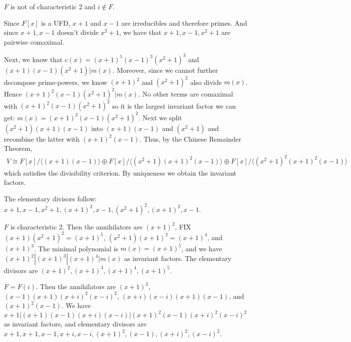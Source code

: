 \documentclass[12pt]{article}
\begin{document}
\begin{problem}[5]
\begin{case}[1]
$ F$ is not of characteristic 2 and  $ i \not\in F$.

	Since $ F[x]$ is a UFD,  $ x+1$ and  $ x-1$ are irreducibles and therefore primes. And since $x+1,x-1$ doesn't divide $ x^2+1$, we have that $ x+1, x-1,x^2+1$ are pairwise comaximal.

	Next, we know that $ c(x) = (x+1)^{5}(x-1)^3(x^2+1)^3$ and $(x+1)(x-1)(x^2+1) | m(x)$. Moreover, since we cannot further decompose prime-powers, we know $ (x+1)^2$ and $ (x^2+1)^2$ also divide $ m(x)$. Hence  $ (x+1)^2(x-1)(x^2+1)^2 | m(x)$. No other terms are comaximal with $ (x+1)^2(x-1)(x^2+1)^2$ so it is the largest invariant factor we can get: $ m(x) = (x+1)^2(x-1)(x^2+1)^2$. Next we split $ (x^2+1)(x+1)(x-1)$ into $ (x+1)(x-1)$ and $ (x^2+1)$ and recombine the latter with $ (x+1)^2(x-1)$. Thus, by the Chinese Remainder Theorem,
\begin{align*}
	V \cong F[x] / \langle (x+1)(x-1) \rangle \oplus F[x] / \langle (x^2+1)(x+1)^2(x-1) \rangle \oplus F[x] /  \langle (x^2+1)^2 (x+1)^2(x-1)\rangle 
\end{align*}
which satisfies the divisibility criterion. By uniqueness we obtain the invariant factors.

The elementary divisors follow: $x+1,x-1,x^2+1,(x+1)^2,x-1, (x^2+1)^2,(x+1)^2,x-1$.
\end{case}
\begin{case}[2]
$ F$ is characteristic 2. Then the annihilators are $ (x+1)^2$, FIX $ (x+1)(x^2+1)^2 = (x+1)^{5}$, $ (x^2+1)(x+1)^2 = (x+1)^{4}$, and $(x+1)^3$. The minimal polynomial is $m(x)= (x+1)^5$, and we have $ (x+1)^2|(x+1)^3|(x+1)^4|m(x)$ as invariant factors. The elementary divisors are $ (x+1)^2,(x+1)^3,(x+1)^4, (x+1)^5$.
\end{case}

\begin{case}[3]
$ F = F(i)$. Then the annihilators are $ (x+1)^2$, $(x-1)(x+1)(x+i)^2(x-i)^2$, $(x+i)(x-i)(x+1)(x-1)$, and $ (x+1)^2(x-1)$. We have $ x+1|(x+1)(x-1)(x+i)(x-i)|(x+1)^2(x-1)(x+i)^2(x-i)^2$ as invariant factors, and elementary divisors are $ x+1,x+1,x-1,x+i,x-i,(x+1)^2,(x-1),(x+i)^2,(x-i)^2$.
\end{case}
\end{problem}
\end{document}
